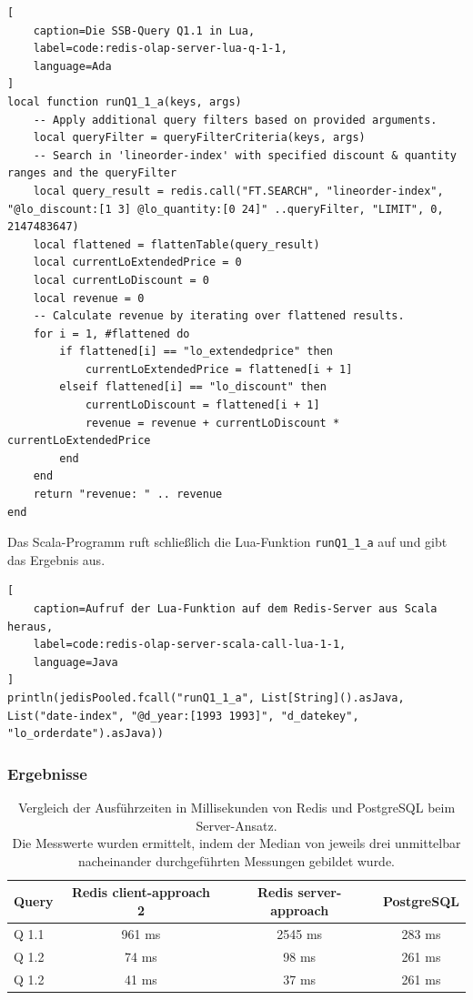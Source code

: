 \begin{lstlisting}[
    caption=Die SSB-Query Q1.1 in Lua,
    label=code:redis-olap-server-lua-q-1-1,
    language=Ada
]
local function runQ1_1_a(keys, args)
    -- Apply additional query filters based on provided arguments.
    local queryFilter = queryFilterCriteria(keys, args)
    -- Search in 'lineorder-index' with specified discount & quantity ranges and the queryFilter
    local query_result = redis.call("FT.SEARCH", "lineorder-index", "@lo_discount:[1 3] @lo_quantity:[0 24]" ..queryFilter, "LIMIT", 0, 2147483647)
    local flattened = flattenTable(query_result)
    local currentLoExtendedPrice = 0
    local currentLoDiscount = 0
    local revenue = 0
    -- Calculate revenue by iterating over flattened results.
    for i = 1, #flattened do
        if flattened[i] == "lo_extendedprice" then
            currentLoExtendedPrice = flattened[i + 1]
        elseif flattened[i] == "lo_discount" then
            currentLoDiscount = flattened[i + 1]
            revenue = revenue + currentLoDiscount * currentLoExtendedPrice
        end
    end
    return "revenue: " .. revenue
end
\end{lstlisting}

Das Scala-Programm ruft schließlich die Lua-Funktion \lstinline|runQ1_1_a| auf und gibt das Ergebnis aus.

\begin{lstlisting}[
    caption=Aufruf der Lua-Funktion auf dem Redis-Server aus Scala heraus,
    label=code:redis-olap-server-scala-call-lua-1-1,
    language=Java
]
println(jedisPooled.fcall("runQ1_1_a", List[String]().asJava, List("date-index", "@d_year:[1993 1993]", "d_datekey", "lo_orderdate").asJava))
\end{lstlisting}


\subsubsection{Ergebnisse}

\begin{table}[h]
\centering
\begin{tabular}{lccc}
\hline
Query & Redis client-approach 2 & Redis server-approach & PostgreSQL \\ \hline
Q 1.1 & 961 ms & 2545 ms  & 283 ms       \\
Q 1.2 & 74 ms & 98 ms    & 261 ms       \\ 
Q 1.2 & 41 ms & 37 ms    & 261 ms       \\ \hline
\end{tabular}
\caption{Vergleich der Ausführzeiten in Millisekunden von Redis und PostgreSQL beim Server-Ansatz.\\
 Die Messwerte wurden ermittelt, indem der Median von jeweils drei unmittelbar nacheinander durchgeführten Messungen gebildet wurde.}
\label{tab:results-server}
\end{table}


